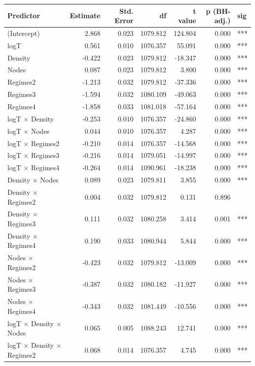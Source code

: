 \begin{table}[ht]
\centering
\begin{tabular}{lrrrrrl}
  \hline
Predictor & Estimate & Std. Error & df & t value & p (BH-adj.) & sig \\ 
  \hline
(Intercept) & 2.868 & 0.023 & 1079.812 & 124.804 & 0.000 & *** \\ 
  logT & 0.561 & 0.010 & 1076.357 & 55.091 & 0.000 & *** \\ 
  Density & -0.422 & 0.023 & 1079.812 & -18.347 & 0.000 & *** \\ 
  Nodes & 0.087 & 0.023 & 1079.812 & 3.800 & 0.000 & *** \\ 
  Regimes2 & -1.213 & 0.032 & 1079.812 & -37.336 & 0.000 & *** \\ 
  Regimes3 & -1.594 & 0.032 & 1080.109 & -49.063 & 0.000 & *** \\ 
  Regimes4 & -1.858 & 0.033 & 1081.018 & -57.164 & 0.000 & *** \\ 
  logT × Density & -0.253 & 0.010 & 1076.357 & -24.860 & 0.000 & *** \\ 
  logT × Nodes & 0.044 & 0.010 & 1076.357 & 4.287 & 0.000 & *** \\ 
  logT × Regimes2 & -0.210 & 0.014 & 1076.357 & -14.568 & 0.000 & *** \\ 
  logT × Regimes3 & -0.216 & 0.014 & 1079.051 & -14.997 & 0.000 & *** \\ 
  logT × Regimes4 & -0.264 & 0.014 & 1090.961 & -18.238 & 0.000 & *** \\ 
  Density × Nodes & 0.089 & 0.023 & 1079.811 & 3.855 & 0.000 & *** \\ 
  Density × Regimes2 & 0.004 & 0.032 & 1079.812 & 0.131 & 0.896 &  \\ 
  Density × Regimes3 & 0.111 & 0.032 & 1080.258 & 3.414 & 0.001 & *** \\ 
  Density × Regimes4 & 0.190 & 0.033 & 1080.944 & 5.844 & 0.000 & *** \\ 
  Nodes × Regimes2 & -0.423 & 0.032 & 1079.812 & -13.009 & 0.000 & *** \\ 
  Nodes × Regimes3 & -0.387 & 0.032 & 1080.182 & -11.927 & 0.000 & *** \\ 
  Nodes × Regimes4 & -0.343 & 0.032 & 1081.449 & -10.556 & 0.000 & *** \\ 
  logT × Density × Nodes & 0.065 & 0.005 & 1088.243 & 12.741 & 0.000 & *** \\ 
  logT × Density × Regimes2 & 0.068 & 0.014 & 1076.357 & 4.745 & 0.000 & *** \\ 

\end{tabular}
\end{table}
